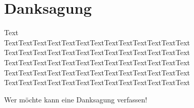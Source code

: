 %
%
\newpage

%
%
\section*{Danksagung}
Text\\
TextTextTextTextTextTextTextTextTextTextTextTextText TextTextTextTextTextTextTextTextTextTextTextTextText TextTextTextTextTextTextTextTextTextTextTextTextText TextTextTextTextTextTextTextTextTextTextTextTextText TextTextTextTextTextTextTextTextTextTextTextTextText

\vspace{4cm}

Wer m\"ochte kann eine Danksagung verfassen!